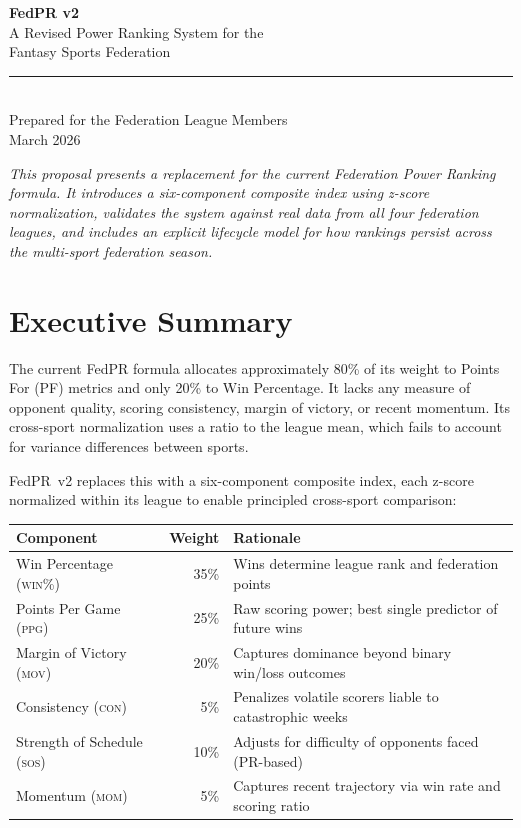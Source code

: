 \documentclass[11pt,a4paper]{article}
\begin{document}
\begin{center}
{\Huge\bfseries\color{navy} FedPR v2}\\[8pt]
{\Large A Revised Power Ranking System for the\\Fantasy Sports Federation}\\[20pt]
\rule{0.5\textwidth}{0.5pt}\\[12pt]
{\large Prepared for the Federation League Members}\\[4pt]
{\large March 2026}\\[16pt]
\end{center}

\noindent\textit{This proposal presents a replacement for the current Federation Power Ranking formula. It introduces a six-component composite index using z-score normalization, validates the system against real data from all four federation leagues, and includes an explicit lifecycle model for how rankings persist across the multi-sport federation season.}

\vspace{12pt}
\tableofcontents
\newpage

\section{Executive Summary}

The current FedPR formula allocates approximately 80\% of its weight to Points For (PF) metrics and only 20\% to Win Percentage. It lacks any measure of opponent quality, scoring consistency, margin of victory, or recent momentum. Its cross-sport normalization uses a ratio to the league mean, which fails to account for variance differences between sports.

FedPR~v2 replaces this with a six-component composite index, each z-score normalized within its league to enable principled cross-sport comparison:

\begin{table}[H]
\centering
\begin{tabular}{@{}lrl@{}}
\toprule
\textbf{Component} & \textbf{Weight} & \textbf{Rationale}\\
\midrule
Win Percentage (\textsc{win\%}) & 35\% & Wins determine league rank and federation points\\
Points Per Game (\textsc{ppg}) & 25\% & Raw scoring power; best single predictor of future wins\\
Margin of Victory (\textsc{mov}) & 20\% & Captures dominance beyond binary win/loss outcomes\\
Consistency (\textsc{con}) & 5\% & Penalizes volatile scorers liable to catastrophic weeks\\
Strength of Schedule (\textsc{sos}) & 10\% & Adjusts for difficulty of opponents faced (PR-based)\\
Momentum (\textsc{mom}) & 5\% & Captures recent trajectory via win rate and scoring ratio\\
\bottomrule
\end{tabular}
\end{table}
\end{document}

